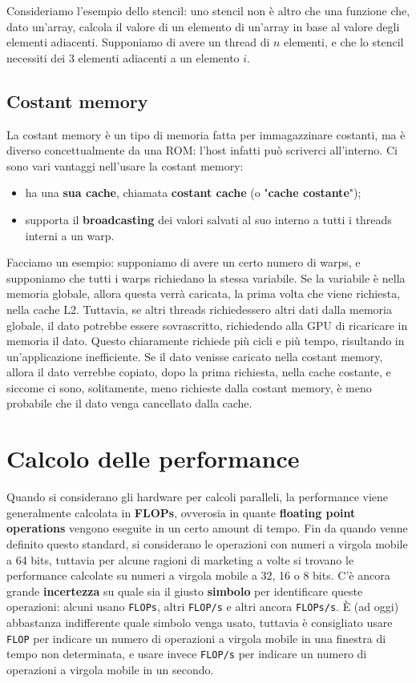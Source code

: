 Consideriamo l'esempio dello stencil: uno stencil non è altro che una funzione che, dato un'array, calcola il valore di un elemento di un'array in base al valore degli elementi adiacenti. Supponiamo di avere un thread di $n$ elementi, e che lo stencil necessiti dei 3 elementi adiacenti a un elemento $i$. 
\nwl

\subsection{Costant memory}

La costant memory è un tipo di memoria fatta per immagazzinare costanti, ma è diverso concettualmente da una ROM: l'host infatti può scriverci all'interno. Ci sono vari vantaggi nell'usare la costant memory:
\begin{itemize}
    \item ha una \textbf{sua cache}, chiamata \textbf{costant cache} (o "\textbf{cache costante}");
    \item supporta il \textbf{broadcasting} dei valori salvati al suo interno a tutti i threads interni a un warp.
\end{itemize}

Facciamo un esempio: supponiamo di avere un certo numero di warps, e supponiamo che tutti i warps richiedano la stessa variabile. Se la variabile è nella memoria globale, allora questa verrà caricata, la prima volta che viene richiesta, nella cache L2. Tuttavia, se altri threads richiedessero altri dati dalla memoria globale, il dato potrebbe essere sovrascritto, richiedendo alla GPU di ricaricare in memoria il dato. Questo chiaramente richiede più cicli e più tempo, risultando in un'applicazione inefficiente.
\nwl
Se il dato venisse caricato nella costant memory, allora il dato verrebbe copiato, dopo la prima richiesta, nella cache costante, e siccome ci sono, solitamente, meno richieste dalla costant memory, è meno probabile che il dato venga cancellato dalla cache.

\section{Calcolo delle performance}

Quando si considerano gli hardware per calcoli paralleli, la performance viene generalmente calcolata in \textbf{FLOPs}, ovverosia in quante \textbf{floating point operations} vengono eseguite in un certo amount di tempo. Fin da quando venne definito questo standard, si considerano le operazioni con numeri a virgola mobile a 64 bits, tuttavia per alcune ragioni di marketing a volte si trovano le performance calcolate su numeri a virgola mobile a 32, 16 o 8 bits.
\nwl
C'è ancora grande \textbf{incertezza} su quale sia il giusto \textbf{simbolo} per identificare queste operazioni: alcuni usano \verb|FLOPs|, altri \verb|FLOP/s| e altri ancora \verb|FLOPs/s|. È (ad oggi) abbastanza indifferente quale simbolo venga usato, tuttavia è consigliato usare \verb|FLOP| per indicare un numero di operazioni a virgola mobile in una finestra di tempo non determinata, e usare invece \verb|FLOP/s| per indicare un numero di operazioni a virgola mobile in un secondo.
\nwl
